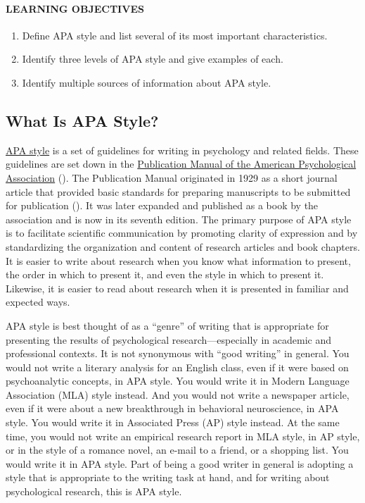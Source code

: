 \documentclass[
]{krantz}
\providecommand{\tightlist}{%
  \setlength{\itemsep}{0pt}\setlength{\parskip}{0pt}}
\begin{document}
\paragraph*{LEARNING OBJECTIVES}\label{learning-objectives-30}

\begin{enumerate}
\def\labelenumi{\arabic{enumi}.}
\tightlist
\item
  Define APA style and list several of its most important characteristics.
\item
  Identify three levels of APA style and give examples of each.
\item
  Identify multiple sources of information about APA style.
\end{enumerate}

\subsection*{What Is APA Style?}\label{what-is-apa-style}


\hyperref[apa-style]{APA style} is a set of guidelines for writing in psychology and related fields. These guidelines are set down in the \hyperref[publication-manual-of-the-american-psychological-association]{Publication Manual of the American Psychological Association} (). The Publication Manual originated in 1929 as a short journal article that provided basic standards for preparing manuscripts to be submitted for publication (). It was later expanded and published as a book by the association and is now in its seventh edition. The primary purpose of APA style is to facilitate scientific communication by promoting clarity of expression and by standardizing the organization and content of research articles and book chapters. It is easier to write about research when you know what information to present, the order in which to present it, and even the style in which to present it. Likewise, it is easier to read about research when it is presented in familiar and expected ways.

APA style is best thought of as a ``genre'' of writing that is appropriate for presenting the results of psychological research---especially in academic and professional contexts. It is not synonymous with ``good writing'' in general. You would not write a literary analysis for an English class, even if it were based on psychoanalytic concepts, in APA style. You would write it in Modern Language Association (MLA) style instead. And you would not write a newspaper article, even if it were about a new breakthrough in behavioral neuroscience, in APA style. You would write it in Associated Press (AP) style instead. At the same time, you would not write an empirical research report in MLA style, in AP style, or in the style of a romance novel, an e-mail to a friend, or a shopping list. You would write it in APA style. Part of being a good writer in general is adopting a style that is appropriate to the writing task at hand, and for writing about psychological research, this is APA style.
\end{document}
